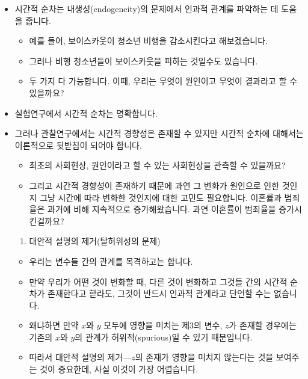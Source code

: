 \documentclass[]{book}
\providecommand{\tightlist}{%
  \setlength{\itemsep}{0pt}\setlength{\parskip}{0pt}}
\begin{document}
\begin{itemize}
\tightlist
\item
  시간적 순차는 내생성(endogeneity)의 문제에서 인과적 관계를 파악하는 데 도움을 줍니다.

  \begin{itemize}
  \tightlist
  \item
    예를 들어, 보이스카웃이 청소년 비행을 감소시킨다고 해보겠습니다.
  \item
    그러나 비행 청소년들이 보이스카웃을 피하는 것일수도 있습니다.
  \item
    두 가지 다 가능합니다. 이때, 우리는 무엇이 원인이고 무엇이 결과라고 할 수 있을까요?
  \end{itemize}
\item
  실험연구에서 시간적 순차는 명확합니다.
\item
  그러나 관찰연구에서는 시간적 경향성은 존재할 수 있지만 시간적 순차에 대해서는 이론적으로 뒷받침이 되어야 합니다.

  \begin{itemize}
  \tightlist
  \item
    최초의 사회현상, 원인이라고 할 수 있는 사회현상을 관측할 수 있을까요?
  \item
    그리고 시간적 경향성이 존재하기 때문에 과연 그 변화가 원인으로 인한 것인지 그냥 시간에 따라 변화한 것인지에 대한 고민도 필요합니다. 이혼률과 범죄율은 과거에 비해 지속적으로 증가해왔습니다. 과연 이혼률이 범죄율을 증가시킨걸까요?
  \end{itemize}

  \begin{enumerate}
  \def\labelenumi{\arabic{enumi}.}
  \setcounter{enumi}{2}
  \tightlist
  \item
    대안적 설명의 제거(탈허위성의 문제)
  \end{enumerate}

  \begin{itemize}
  \tightlist
  \item
    우리는 변수들 간의 관계를 목격하고는 합니다.
  \item
    만약 우리가 어떤 것이 변화할 때, 다른 것이 변화하고 그것들 간의 시간적 순차가 존재한다고 핟라도, 그것이 반드시 인과적 관계라고 단언할 수는 없습니다.
  \item
    왜냐하면 만약 \(x\)와 \(y\) 모두에 영향을 미치는 제3의 변수, \(z\)가 존재할 경우에는 기존의 \(x\)와 \(y\)의 관계가 허위적(spurious)일 수 있기 때문입니다.
  \item
    따라서 대안적 설명의 제거---\(z\)의 존재가 영향을 미치지 않는다는 것을 보여주는 것이 중요한데, 사실 이것이 가장 어렵습니다.


\end{itemize}
\end{itemize}
\end{document}
